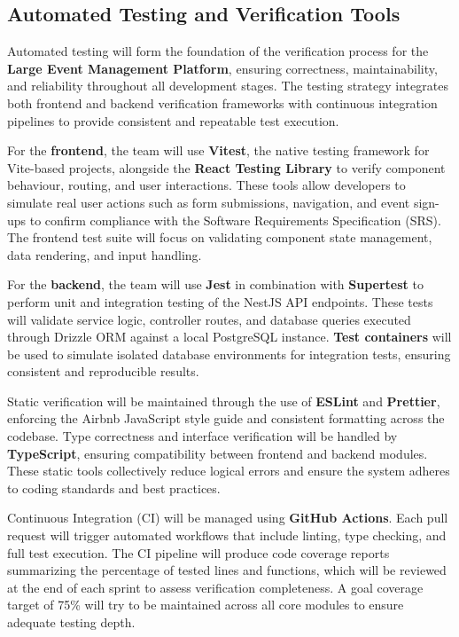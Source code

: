 \documentclass[12pt, titlepage]{article}
\begin{document}
\subsection{Automated Testing and Verification Tools}

Automated testing will form the foundation of the verification process for the \textbf{Large Event Management Platform}, ensuring correctness, maintainability, and reliability throughout all development stages. The testing strategy integrates both frontend and backend verification frameworks with continuous integration pipelines to provide consistent and repeatable test execution.

For the \textbf{frontend}, the team will use \textbf{Vitest}, the native testing framework for Vite-based projects, alongside the \textbf{React Testing Library} to verify component behaviour, routing, and user interactions. These tools allow developers to simulate real user actions such as form submissions, navigation, and event sign-ups to confirm compliance with the Software Requirements Specification (SRS). The frontend test suite will focus on validating component state management, data rendering, and input handling.

For the \textbf{backend}, the team will use \textbf{Jest} in combination with \textbf{Supertest} to perform unit and integration testing of the NestJS API endpoints. These tests will validate service logic, controller routes, and database queries executed through Drizzle ORM against a local PostgreSQL instance. \textbf{Test containers} will be used to simulate isolated database environments for integration tests, ensuring consistent and reproducible results.

Static verification will be maintained through the use of \textbf{ESLint} and \textbf{Prettier}, enforcing the Airbnb JavaScript style guide and consistent formatting across the codebase. Type correctness and interface verification will be handled by \textbf{TypeScript}, ensuring compatibility between frontend and backend modules. These static tools collectively reduce logical errors and ensure the system adheres to coding standards and best practices.

Continuous Integration (CI) will be managed using \textbf{GitHub Actions}. Each pull request will trigger automated workflows that include linting, type checking, and full test execution. The CI pipeline will produce code coverage reports summarizing the percentage of tested lines and functions, which will be reviewed at the end of each sprint to assess verification completeness. A goal coverage target of 75\% will try to be maintained across all core modules to ensure adequate testing depth.
\end{document}
